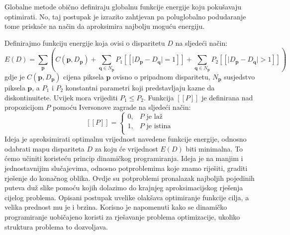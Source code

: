\documentclass[utf8, zavrsni, numeric]{fer}
\begin{document}
Globalne metode obično definiraju globalnu funkcije energije koju pokušavaju optimirati.
No, taj postupak je izrazito zahtjevan pa poluglobalno podudaranje tome priskače na način
da aproksimira najbolju moguću energiju.

Definirajmo funkciju energije koja ovisi o disparitetu $D$ na sljedeći način:
\begin{equation} \label{energija}
E(D) = \sum_{\mathbf{p}}(C(\mathbf{p}, D_{\mathbf{p}}) + \sum_{\mathbf{q} \in N_{\mathbf{p}}} P_1 [\![\lvert D_{\mathbf{p}} - D_{\mathbf{q}}\rvert = 1]\!] + \sum_{\mathbf{q} \in N_{\mathbf{p}}} P_2 [\![\lvert D_{\mathbf{p}} - D_{\mathbf{q}}\rvert > 1]\!])
\end{equation}
gdje je $C(\mathbf{p}, D_{\mathbf{p}})$ cijena piksela $\mathbf{p}$ ovisno o pripadnom disparitetu, $N_{\mathbf{p}}$ susjedstvo piksela $\mathbf{p}$, a $P_1$ i $P_2$ konstantni parametri koji predstavljaju kazne da diskontinuitete. Uvijek mora vrijediti $P_1 \leq P_2$.
Funkcija $[\![P]\!]$ je definirana nad propozicijom $P$ pomoću Iversonove zagrade na sljedeći način:
\[   
[\![P]\!] = 
     \begin{cases}
       0, & P \text{ je laž} \\
       1, & P \text{ je istina} \\
     \end{cases}
\]
Ideja je aproksimirati optimalnu vrijednost navedene funkcije energije, odnosno odabrati
mapu dispariteta $D$ za koju će vrijednost $E(D)$ biti minimalna. To ćemo
učiniti koristeću princip dinamičkog programiranja. Ideja je na manjim i jednostavnijim
slučajevima, odnosno potproblemima koje znamo riješiti, graditi rješenje do konačnog oblika. Ovdje su potproblemi pronalazak najboljih pojedinih puteva duž slike pomoću kojih dolazimo do krajnjeg aproksimacijskog rješenja cijelog problema. Opisani postupak uvelike olakšava optimiranje funkcije cilja, a velika
prednost mu je i brzina. Korisno je napomenuti kako se dinamičko programiranje uobičajeno koristi za rješavanje problema optimizacije, ukoliko struktura problema to dozvoljava.
\end{document}
